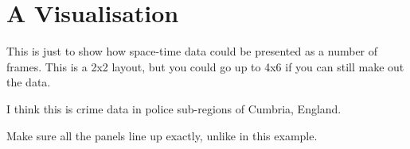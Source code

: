 
\section{A Visualisation}

This is just to show how space-time data could be presented
as a number of frames. This is a 2x2 layout, but you could
go up to 4x6 if you can still make out the data.

I think this is crime data in police sub-regions of Cumbria, England.

Make sure all the panels line up exactly, unlike in this example.


